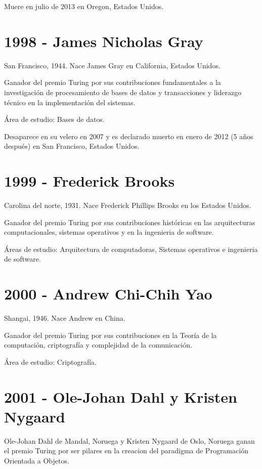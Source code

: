\documentclass[notitlepage,letterpaper, 11pt]{article}
\begin{document}
\noindent Muere en julio de 2013 en Oregon, Estados Unidos.
\newline


\section*{1998 - James Nicholas Gray}
\noindent San Francisco, 1944. Nace James Gray en California, Estados Unidos.

\noindent Ganador del premio Turing por sus contribuciones fundamentales a la investigación de procesamiento de bases de datos y transacciones y liderazgo técnico en la implementación del sistemas.

\noindent Área de estudio: Bases de datos. 

\noindent Desaparece en su velero en 2007 y es declarado muerto en enero de 2012 (5 años después) en San Francisco, Estados Unidos.
\newline

\section*{1999 - Frederick Brooks}
\noindent Carolina del norte, 1931. Nace Frederick Phillips Brooks en los Estados Unidos.

\noindent Ganador del premio Turing por sus contribuciones históricas en las arquitecturas computacionales, sistemas operativos y en la ingenieria de software.

\noindent Áreas de estudio: Arquitectura de computadoras, Sistemas operativos e ingenieria de software. 
\newline

\section*{2000 - Andrew Chi-Chih Yao}
\noindent Shangai, 1946. Nace Andrew en China.

\noindent Ganador del premio Turing por sus contribuciones en la Teoría de la computación, criptografía y complejidad de la comunicación.

\noindent Área de estudio: Criptografía. 
\newline


\section*{2001 - Ole-Johan Dahl y Kristen Nygaard}
\noindent Ole-Johan Dahl de Mandal, Noruega y Kristen Nygaard  de Oslo, Noruega  ganan el premio Turing por ser pilares en la creacion del paradigma de Programación Orientada a Objetos.
\end{document}
